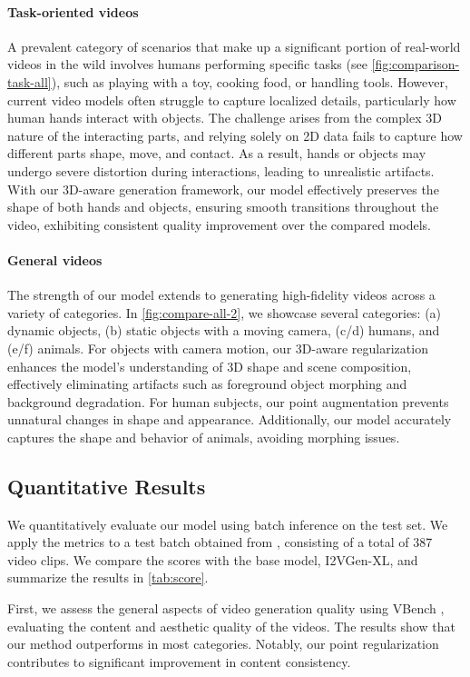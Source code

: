 \paragraph{Task-oriented videos} A prevalent category of scenarios that make up a significant portion of real-world videos in the wild involves humans performing specific tasks (see \autoref{fig:comparison-task-all}), such as playing with a toy, cooking food, or handling tools. However, current video models often struggle to capture localized details, particularly how human hands interact with objects. The challenge arises from the complex 3D nature of the interacting parts, and relying solely on 2D data fails to capture how different parts shape, move, and contact. As a result, hands or objects may undergo severe distortion during interactions, leading to unrealistic artifacts. With our 3D-aware generation framework, our model effectively preserves the shape of both hands and objects, ensuring smooth transitions throughout the video, exhibiting consistent quality improvement over the compared models.

\paragraph{General videos} The strength of our model extends to generating high-fidelity videos across a variety of categories. In \autoref{fig:compare-all-2}, we showcase several categories: (a) dynamic objects, (b) static objects with a moving camera, (c/d) humans, and (e/f) animals. For objects with camera motion, our 3D-aware regularization enhances the model’s understanding of 3D shape and scene composition, effectively eliminating artifacts such as foreground object morphing and background degradation. For human subjects, our point augmentation prevents unnatural changes in shape and appearance. Additionally, our model accurately captures the shape and behavior of animals, avoiding morphing issues.

\subsection{Quantitative Results}
We quantitatively evaluate our model using batch inference on the test set. We apply the metrics to a test batch obtained from \cite{chen2024panda}, consisting of a total of 387 video clips. We compare the scores with the base model, I2VGen-XL, and summarize the results in \autoref{tab:score}.

First, we assess the general aspects of video generation quality using VBench \cite{huang2024vbench}, evaluating the content and aesthetic quality of the videos. The results show that our method outperforms in most categories. Notably, our point regularization contributes to significant improvement in content consistency.

